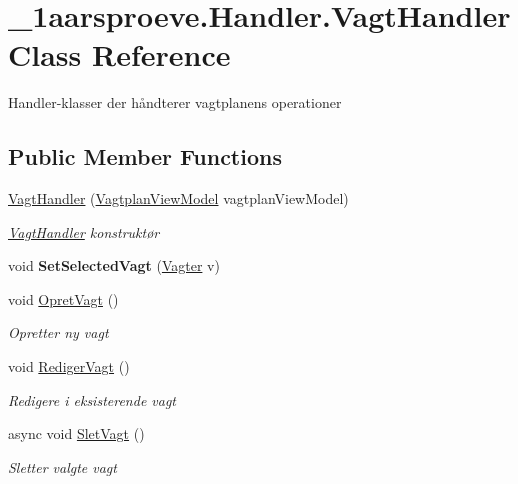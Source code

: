 \hypertarget{class__1aarsproeve_1_1_handler_1_1_vagt_handler}{}\section{\+\_\+1aarsproeve.\+Handler.\+Vagt\+Handler Class Reference}
\label{class__1aarsproeve_1_1_handler_1_1_vagt_handler}


Handler-\/klasser der håndterer vagtplanens operationer  


\subsection*{Public Member Functions}
\begin{DoxyCompactItemize}
\item 
\hyperlink{class__1aarsproeve_1_1_handler_1_1_vagt_handler_a030580ed58226bf1741303da667a7954}{Vagt\+Handler} (\hyperlink{class__1aarsproeve_1_1_view_model_1_1_vagtplan_view_model}{Vagtplan\+View\+Model} vagtplan\+View\+Model)
\begin{DoxyCompactList}\small\item\em \hyperlink{class__1aarsproeve_1_1_handler_1_1_vagt_handler}{Vagt\+Handler} konstruktør \end{DoxyCompactList}\item 
\hypertarget{class__1aarsproeve_1_1_handler_1_1_vagt_handler_ad99d4d82756eb8e546e528dc619ec51c}{}void {\bfseries Set\+Selected\+Vagt} (\hyperlink{class__1aarsproeve_1_1_model_1_1_vagter}{Vagter} v)\label{class__1aarsproeve_1_1_handler_1_1_vagt_handler_ad99d4d82756eb8e546e528dc619ec51c}

\item 
void \hyperlink{class__1aarsproeve_1_1_handler_1_1_vagt_handler_a1fd83f7cf36110449f308ed5d0029935}{Opret\+Vagt} ()
\begin{DoxyCompactList}\small\item\em Opretter ny vagt \end{DoxyCompactList}\item 
void \hyperlink{class__1aarsproeve_1_1_handler_1_1_vagt_handler_a12d58edb6cb14b8d9071e64c5ec2eee9}{Rediger\+Vagt} ()
\begin{DoxyCompactList}\small\item\em Redigere i eksisterende vagt \end{DoxyCompactList}\item 
async void \hyperlink{class__1aarsproeve_1_1_handler_1_1_vagt_handler_a5ae24ac34975967834daefb50c95c0a4}{Slet\+Vagt} ()
\begin{DoxyCompactList}\small\item\em Sletter valgte vagt \end{DoxyCompactList}\end{DoxyCompactItemize}
